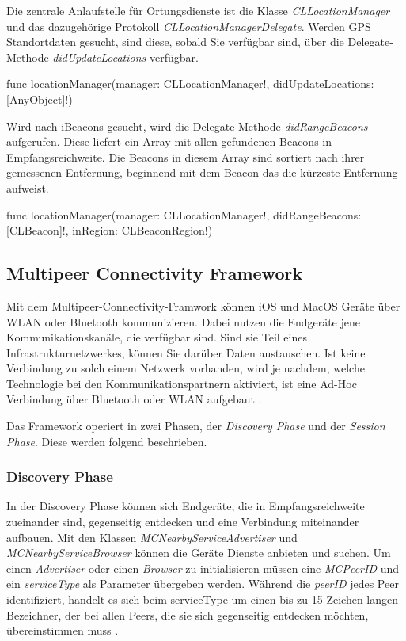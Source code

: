 Die zentrale Anlaufstelle für Ortungsdienste ist die Klasse \textit{CLLocationManager} und das dazugehörige Protokoll \textit{CLLocationManagerDelegate}. Werden \acs{GPS} Standortdaten gesucht, sind diese, sobald Sie verfügbar sind, über die Delegate-Methode \textit{didUpdateLocations} verfügbar.

\begin{description}
  \item \textcolor{type}{func} locationManager(manager: \textcolor{parameter}{CLLocationManager!}, didUpdateLocations: \textcolor{parameter}{[AnyObject]!})
\end{description}

Wird nach iBeacons gesucht, wird die Delegate-Methode \textit{didRangeBeacons} aufgerufen. Diese liefert ein Array mit allen gefundenen Beacons in Empfangsreichweite. Die Beacons in diesem Array sind sortiert nach ihrer gemessenen Entfernung, beginnend mit dem Beacon das die kürzeste Entfernung aufweist.

\begin{description} 
  \item \textcolor{type}{func} locationManager(manager: \textcolor{parameter}{CLLocationManager!}, didRangeBeacons: \textcolor{parameter}{[CLBeacon]!}, inRegion: \textcolor{parameter}{ CLBeaconRegion!})
\end{description}

\subsection{Multipeer Connectivity Framework}
Mit dem Multipeer-Connectivity-Framwork können \acs{iOS} und \acs{MacOS} Geräte über \ac{WLAN} oder Bluetooth kommunizieren. Dabei nutzen die Endgeräte jene Kommunikationskanäle, die verfügbar sind. Sind sie Teil eines Infrastrukturnetzwerkes, können Sie darüber Daten austauschen. Ist keine Verbindung zu solch einem Netzwerk vorhanden, wird je nachdem, welche Technologie bei den Kommunikationspartnern aktiviert, ist eine Ad-Hoc Verbindung über Bluetooth oder \ac{WLAN} aufgebaut \cite{AppleMultipeer:Online}.

Das Framework operiert in zwei Phasen, der \textit{Discovery Phase} und der \textit{Session Phase}. Diese werden folgend beschrieben.

\subsubsection{Discovery Phase}
In der Discovery Phase können sich Endgeräte, die in Empfangsreichweite zueinander sind, gegenseitig entdecken und eine Verbindung miteinander aufbauen. Mit den Klassen \textit{MCNearbyServiceAdvertiser} und \textit{MCNearbyServiceBrowser} können die Geräte Dienste anbieten und suchen. Um einen \textit{Advertiser} oder einen \textit{Browser} zu initialisieren müssen eine \textit{MCPeerID} und ein \textit{serviceType} als Parameter übergeben werden. Während die \textit{peerID} jedes Peer identifiziert, handelt es sich beim serviceType um einen bis zu 15 Zeichen langen Bezeichner, der bei allen Peers, die sie sich gegenseitig entdecken möchten, übereinstimmen muss \cite{AppleMultipeer:Online}.

